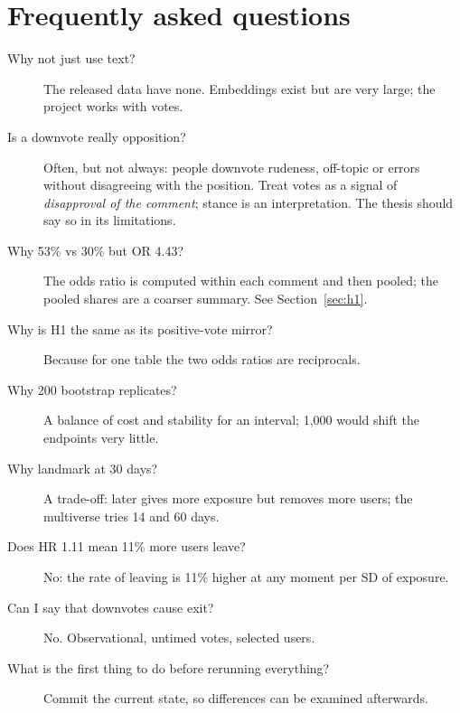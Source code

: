 \section*{Frequently asked questions}
\begin{description}
  \item[Why not just use text?] The released data have none. Embeddings exist but are very large; the project works with votes.
  \item[Is a downvote really opposition?] Often, but not always: people downvote rudeness, off-topic or errors without disagreeing with the position. Treat votes as a signal of \emph{disapproval of the comment}; stance is an interpretation. The thesis should say so in its limitations.
  \item[Why 53\% vs 30\% but OR 4.43?] The odds ratio is computed within each comment and then pooled; the pooled shares are a coarser summary. See Section~\ref{sec:h1}.
  \item[Why is H1 the same as its positive-vote mirror?] Because for one table the two odds ratios are reciprocals.
  \item[Why 200 bootstrap replicates?] A balance of cost and stability for an interval; 1,000 would shift the endpoints very little.
  \item[Why landmark at 30 days?] A trade-off: later gives more exposure but removes more users; the multiverse tries 14 and 60 days.
  \item[Does HR 1.11 mean 11\% more users leave?] No: the rate of leaving is 11\% higher at any moment per SD of exposure.
  \item[Can I say that downvotes cause exit?] No. Observational, untimed votes, selected users.
  \item[What is the first thing to do before rerunning everything?] Commit the current state, so differences can be examined afterwards.
\end{description}
